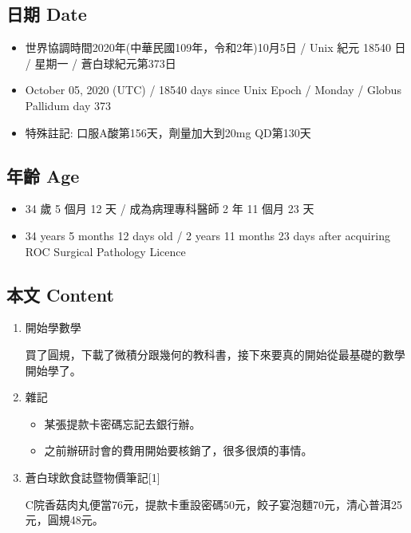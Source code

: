 \documentclass[
]{article}
\providecommand{\tightlist}{%
  \setlength{\itemsep}{0pt}\setlength{\parskip}{0pt}}
\begin{document}
\hypertarget{ux65e5ux671f-date-32}{%
\subsection{日期 Date}\label{ux65e5ux671f-date-32}}

\begin{itemize}
\tightlist
\item
  世界協調時間2020年(中華民國109年，令和2年)10月5日 / Unix 紀元 18540 日
  / 星期一 / 蒼白球紀元第373日
\item
  October 05, 2020 (UTC) / 18540 days since Unix Epoch / Monday / Globus
  Pallidum day 373
\item
  特殊註記: 口服A酸第156天，劑量加大到20mg QD第130天
\end{itemize}

\hypertarget{ux5e74ux9f61-age-32}{%
\subsection{年齡 Age}\label{ux5e74ux9f61-age-32}}

\begin{itemize}
\tightlist
\item
  34 歲 5 個月 12 天 / 成為病理專科醫師 2 年 11 個月 23 天
\item
  34 years 5 months 12 days old / 2 years 11 months 23 days after
  acquiring ROC Surgical Pathology Licence
\end{itemize}

\hypertarget{ux672cux6587-content-32}{%
\subsection{本文 Content}\label{ux672cux6587-content-32}}

\begin{enumerate}
\def\labelenumi{\arabic{enumi}.}
\item
  開始學數學

  買了圓規，下載了微積分跟幾何的教科書，接下來要真的開始從最基礎的數學開始學了。
\item
  雜記

  \begin{itemize}
  \tightlist
  \item
    某張提款卡密碼忘記去銀行辦。
  \item
    之前辦研討會的費用開始要核銷了，很多很煩的事情。
  \end{itemize}
\item
  蒼白球飲食誌暨物價筆記{[}1{]}

  C院香菇肉丸便當76元，提款卡重設密碼50元，餃子宴泡麵70元，清心普洱25元，圓規48元。
\end{enumerate}
\end{document}
